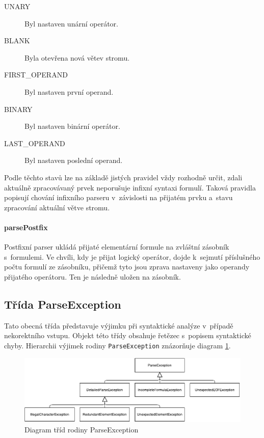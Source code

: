 \documentclass[thesis=B,czech,hidelinks]{thesis}[2012/06/26]
\begin{document}
\begin{description}
	\item[UNARY] Byl nastaven unární operátor. 
	\item[BLANK] Byla otevřena nová větev stromu.
	\item[FIRST\_OPERAND] Byl nastaven první operand.
	\item[BINARY] Byl nastaven binární operátor.
	\item[LAST\_OPERAND] Byl nastaven poslední operand.
\end{description}

Podle těchto stavů lze na základě jistých pravidel vždy rozhodně určit, zdali aktuálně zpracovávaný prvek neporušuje infixní syntaxi formulí. Taková pravidla popisují chování infixního parseru v~závislosti na přijatém prvku a~stavu zpracování aktuální větve stromu.

\paragraph{parsePostfix}

Postfixní parser ukládá přijaté elementární formule na zvláštní zásobník s~formulemi. Ve chvíli, kdy je přijat logický operátor, dojde k~sejmutí příslušného počtu formulí ze zásobníku, přičemž tyto jsou zprava nastaveny jako operandy přijatého operátoru. Ten je následně uložen na zásobník.

\subsection{Třída ParseException}

Tato obecná třída představuje výjimku při syntaktické analýze v~případě nekorektního vstupu. Objekt této třídy obsahuje řetězec s~popisem syntaktické chyby. Hierarchii výjimek rodiny \texttt{ParseException} znázorňuje diagram \ref{fig:parse_exception}.

\begin{figure}
\centering
\caption{Diagram tříd rodiny ParseException}
\label{fig:parse_exception}
\includegraphics[width=\linewidth]{diagrams/parse_exception}
\end{figure}
\end{document}
